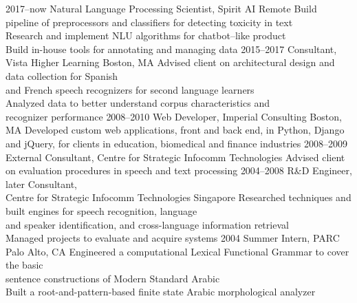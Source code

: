 \documentclass[]{friggeri-cv}
\begin{document}
\begin{entrylist}
  \entry
    {2017--now}
    {Natural Language Processing Scientist, Spirit AI}
    {Remote}
    {
     \Squaredot Build pipeline of preprocessors and classifiers for detecting toxicity in text \\
     \Squaredot Research and implement NLU algorithms for chatbot--like product \\
     \Squaredot Build in-house tools for annotating and managing data
    }
  \entry
    {2015--2017}
    {Consultant, Vista Higher Learning}
    {Boston, MA}
    {
     \Squaredot Advised client on architectural design and data collection for Spanish \\
     \hspace*{3pt} and French speech recognizers for second language learners \\
     \Squaredot Analyzed data to better understand corpus characteristics and \\
     \hspace*{3pt} recognizer performance
    }
  \entry
    {2008--2010}
    {Web Developer, Imperial Consulting}
    {Boston, MA}
    {
     \Squaredot Developed custom web applications, front and back end, in Python, Django \\ 
     \hspace*{3pt} and jQuery, for clients in education, biomedical and finance industries
    }
  \entry
    {2008--2009}
    {External Consultant, Centre for Strategic Infocomm Technologies}
    {}
    {\Squaredot Advised client on evaluation procedures in speech and text processing}
  \entry
    {2004--2008}
    {R\&D Engineer, later Consultant, \\ Centre for Strategic Infocomm Technologies}
    {Singapore}
    {\Squaredot Researched techniques and built engines for speech recognition, language \\
    \hspace*{3pt} and speaker identification, and cross-language information retrieval \\
    \Squaredot Managed projects to evaluate and acquire systems}
  \entry
    {2004}
    {Summer Intern, PARC}
    {Palo Alto, CA}
    {\Squaredot Engineered a computational Lexical Functional Grammar to cover the basic \\
     \hspace*{3pt} sentence constructions of Modern Standard Arabic \\
	\Squaredot Built a root-and-pattern-based finite state Arabic morphological analyzer}
\end{entrylist}
\end{document}
